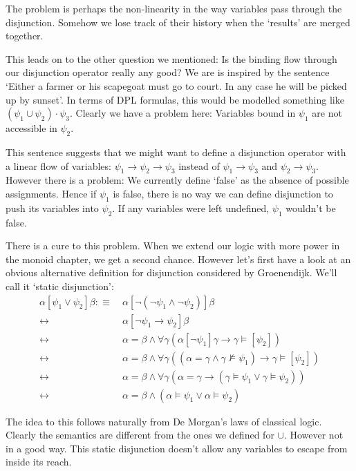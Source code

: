 \documentclass[12pt]{article}
\begin{document}
The problem is perhaps the non-linearity in the way variables pass through the disjunction. Somehow we lose track of their history when the `results' are merged together.

This leads on to the other question we mentioned: Is the binding flow through our disjunction operator really any good? We are is inspired by the sentence `Either a farmer or his scapegoat must go to court. In any case he will be picked up by sunset'. In terms of DPL formulas, this would be modelled something like $(\psi_1\cup\psi_2)\cdot\psi_3$. Clearly we have a problem here: Variables bound in $\psi_1$ are not accessible in $\psi_2$.

This sentence suggests that we might want to define a disjunction operator with a linear flow of variables: $\psi_1\to\psi_2\to\psi_3$ instead of $\psi_1\to\psi_3\text{ and }\psi_2\to\psi_3$. However there is a problem: We currently define `false' as the absence of possible assignments. Hence if $\psi_1$ is false, there is no way we can define disjunction to push its variables into $\psi_2$. If any variables were left undefined, $\psi_1$ wouldn't be false.

There is a cure to this problem. When we extend our logic with more power in the monoid chapter, we get a second chance. However let's first have a look at an obvious alternative definition for disjunction considered by Groenendijk\cite{groenendijk1991dynamic}. We'll call it `static disjunction':
\begin{align}
\alpha[\psi_1\vee\psi_2]\beta
 :\equiv&\ \alpha[\neg(\neg\psi_1\wedge\neg\psi_2)]\beta \label{sem_or_def}\\
 \leftrightarrow&\ \alpha[\neg\psi_1\rightarrow\psi_2]\beta \nonumber\\
 \leftrightarrow&\ \alpha = \beta \wedge \forall\gamma(\alpha[\neg\psi_1]\gamma\rightarrow\gamma\models[\psi_2]) \nonumber\\
 \leftrightarrow&\ \alpha = \beta \wedge \forall\gamma((\alpha=\gamma\wedge\gamma\not\models\psi_1)\rightarrow\gamma\models[\psi_2]) \nonumber\\
 \leftrightarrow&\ \alpha = \beta \wedge \forall\gamma(\alpha=\gamma\rightarrow(\gamma\models\psi_1\vee\gamma\models\psi_2)) \nonumber\\
 \leftrightarrow&\ \alpha = \beta \wedge (\alpha\models\psi_1\vee\alpha\models\psi_2) \label{sem_or}
\end{align}

The idea to this follows naturally from De Morgan's laws of classical logic. Clearly the semantics are different from the ones we defined for $\cup$. However not in a good way. This static disjunction doesn't allow any variables to escape from inside its reach.
\end{document}

